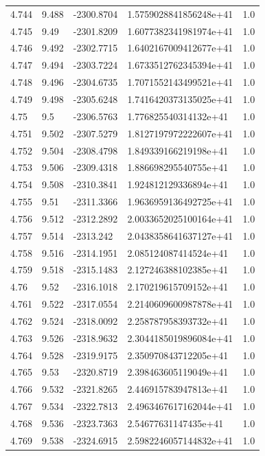\begin{tabular}{lllll}
4.744 & 9.488 & -2300.8704 & 1.5759028841856248e+41 & 1.0 \\
4.745 & 9.49 & -2301.8209 & 1.6077382341981974e+41 & 1.0 \\
4.746 & 9.492 & -2302.7715 & 1.6402167009412677e+41 & 1.0 \\
4.747 & 9.494 & -2303.7224 & 1.6733512762345394e+41 & 1.0 \\
4.748 & 9.496 & -2304.6735 & 1.7071552143499521e+41 & 1.0 \\
4.749 & 9.498 & -2305.6248 & 1.7416420373135025e+41 & 1.0 \\
4.75 & 9.5 & -2306.5763 & 1.776825540314132e+41 & 1.0 \\
4.751 & 9.502 & -2307.5279 & 1.8127197972222607e+41 & 1.0 \\
4.752 & 9.504 & -2308.4798 & 1.849339166219198e+41 & 1.0 \\
4.753 & 9.506 & -2309.4318 & 1.886698295540755e+41 & 1.0 \\
4.754 & 9.508 & -2310.3841 & 1.924812129336894e+41 & 1.0 \\
4.755 & 9.51 & -2311.3366 & 1.9636959136492725e+41 & 1.0 \\
4.756 & 9.512 & -2312.2892 & 2.0033652025100164e+41 & 1.0 \\
4.757 & 9.514 & -2313.242 & 2.0438358641637127e+41 & 1.0 \\
4.758 & 9.516 & -2314.1951 & 2.085124087414524e+41 & 1.0 \\
4.759 & 9.518 & -2315.1483 & 2.127246388102385e+41 & 1.0 \\
4.76 & 9.52 & -2316.1018 & 2.170219615709152e+41 & 1.0 \\
4.761 & 9.522 & -2317.0554 & 2.2140609600987878e+41 & 1.0 \\
4.762 & 9.524 & -2318.0092 & 2.258787958393732e+41 & 1.0 \\
4.763 & 9.526 & -2318.9632 & 2.3044185019896084e+41 & 1.0 \\
4.764 & 9.528 & -2319.9175 & 2.350970843712205e+41 & 1.0 \\
4.765 & 9.53 & -2320.8719 & 2.398463605119049e+41 & 1.0 \\
4.766 & 9.532 & -2321.8265 & 2.446915783947813e+41 & 1.0 \\
4.767 & 9.534 & -2322.7813 & 2.4963467617162044e+41 & 1.0 \\
4.768 & 9.536 & -2323.7363 & 2.54677631147435e+41 & 1.0 \\
4.769 & 9.538 & -2324.6915 & 2.5982246057144832e+41 & 1.0 \\

\end{tabular}
